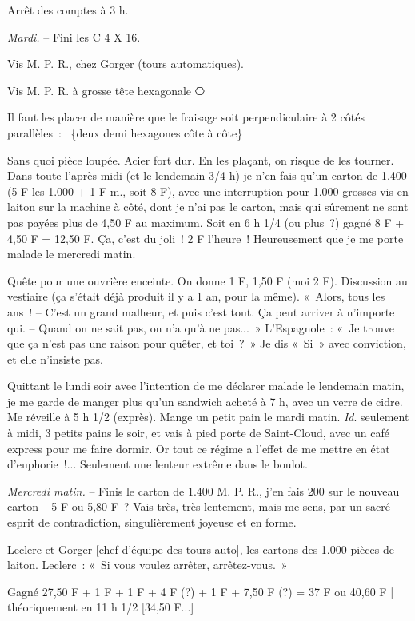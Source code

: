 \documentclass[french,twoside]{book} %
\begin{document}
Arrêt des comptes à 3 h.\par
\par
{\itshape Mardi.} – Fini les C 4 X 16.\par
Vis M. P. R., chez Gorger (tours automatiques).\par
Vis M. P. R. à grosse tête hexagonale ⎔\par
Il faut les placer de manière que le fraisage soit perpendiculaire à 2 côtés parallèles :  \{deux demi hexagones côte à côte\}   \par
Sans quoi pièce loupée. Acier fort dur. En les plaçant, on risque de les tourner. Dans toute l'après-midi (et le lendemain 3/4 h) je n'en fais qu'un carton de 1.400 (5 F les 1.000 + 1 F m., soit 8 F), avec une interruption pour 1.000 grosses vis en laiton sur la machine à côté, dont je n'ai pas le carton, mais qui sûrement ne sont pas payées plus de 4,50 F au maximum. Soit en 6 h 1/4 (ou plus ?) gagné 8 F + 4,50 F = 12,50 F. Ça, c'est du joli ! 2 F l'heure ! Heureusement que je me porte malade le mercredi matin.\par
Quête pour une ouvrière enceinte. On donne 1 F, 1,50 F (moi 2 F). Discussion au vestiaire (ça s'était déjà produit il y a 1 an, pour la même). « Alors, tous les ans ! – C'est un grand malheur, et puis c'est tout. Ça peut arriver à n'importe qui. – Quand on ne sait pas, on n'a qu'à ne pas... » L'Espagnole : « Je trouve que ça n'est pas une raison pour quêter, et toi ? » Je dis « Si » avec conviction, et elle n'insiste pas.\par
Quittant le lundi soir avec l'intention de me déclarer malade le lendemain matin, je me garde de manger plus qu'un sandwich acheté à 7 h, avec un verre de cidre. Me réveille à 5 h 1/2 (exprès). Mange un petit pain le mardi matin. {\itshape Id}. seulement à midi, 3 petits pains le soir, et vais à pied porte de Saint-Cloud, avec un café express pour me faire dormir. Or tout ce régime a l'effet de me mettre en état d'euphorie !... Seulement une lenteur extrême dans le boulot.\par
{\itshape Mercredi matin.} – Finis le carton de 1.400 M. P. R., j'en fais 200 sur le nouveau carton – 5 F ou 5,80 F ? Vais très, très lentement, mais me sens, par un sacré esprit de contradiction, singulièrement joyeuse et en forme.\par
Leclerc et Gorger [chef d'équipe des tours auto], les cartons des 1.000 pièces de laiton. Leclerc : « Si vous voulez arrêter, arrêtez-vous. »\par
Gagné 27,50 F + 1 F + 1 F + 4 F (?) + 1 F + 7,50 F (?) = 37 F ou 40,60 F | théoriquement en 11 h 1/2 [34,50 F...]\par
\end{document}

